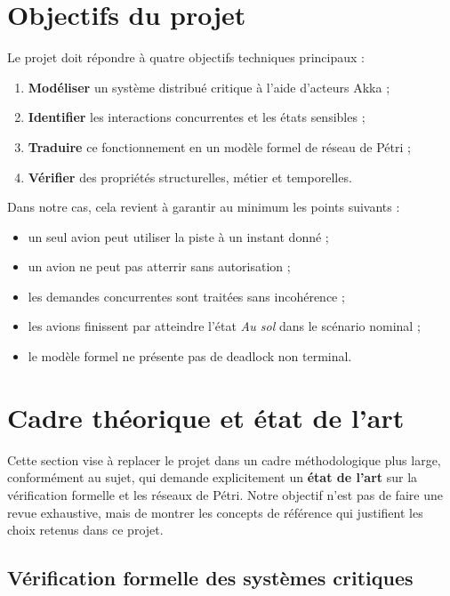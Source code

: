 \documentclass[11pt,a4paper]{article}
\begin{document}
\section{Objectifs du projet}

Le projet doit répondre à quatre objectifs techniques principaux :
\begin{enumerate}
    \item \textbf{Modéliser} un système distribué critique à l'aide d'acteurs Akka ;
    \item \textbf{Identifier} les interactions concurrentes et les états sensibles ;
    \item \textbf{Traduire} ce fonctionnement en un modèle formel de réseau de Pétri ;
    \item \textbf{Vérifier} des propriétés structurelles, métier et temporelles.
\end{enumerate}

Dans notre cas, cela revient à garantir au minimum les points suivants :
\begin{itemize}
    \item un seul avion peut utiliser la piste à un instant donné ;
    \item un avion ne peut pas atterrir sans autorisation ;
    \item les demandes concurrentes sont traitées sans incohérence ;
    \item les avions finissent par atteindre l'état \emph{Au sol} dans le scénario nominal ;
    \item le modèle formel ne présente pas de deadlock non terminal.
\end{itemize}


\section{Cadre théorique et état de l'art}

Cette section vise à replacer le projet dans un cadre méthodologique plus large, conformément au sujet, qui demande explicitement un \textbf{état de l'art} sur la vérification formelle et les réseaux de Pétri. Notre objectif n'est pas de faire une revue exhaustive, mais de montrer les concepts de référence qui justifient les choix retenus dans ce projet.

\subsection{Vérification formelle des systèmes critiques}
\end{document}
